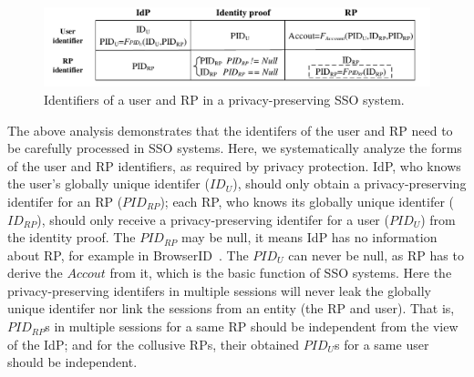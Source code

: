 \begin{figure}
  \centering
  \includegraphics[width=\linewidth]{fig/IDCorrelation.pdf}
  \caption{Identifiers of a user and RP in a privacy-preserving SSO system.}
  \label{fig:IDCorrelation}
\end{figure}

The above analysis demonstrates that the identifers of the user and RP need to be carefully processed in SSO systems.
Here, we systematically analyze the forms of the user and RP identifiers, as required by privacy protection.
IdP, who knows the user's globally unique identifer ($ID_U$), should only obtain a privacy-preserving identifer for an RP ($PID_{RP}$);
 each RP, who knows its globally unique identifer ($ID_{RP}$), should only receive a privacy-preserving identifer for a user ($PID_{U}$) from the identity proof.
The $PID_{RP}$ may be null, it means IdP has no information about RP, for example in BrowserID~\cite{BrowserID}.
The $PID_{U}$ can never be null, as RP has to derive the $Accout$ from it, which is the basic function of SSO systems.
Here the  privacy-preserving identifers in multiple sessions will never leak the globally unique identifer nor link the sessions from an entity (the RP and user).
That is, $PID_{RP}$s in multiple sessions for a same RP  should be independent from the view of the IdP;
 and for the collusive RPs, their obtained $PID_{U}$s for a same user should be independent.

